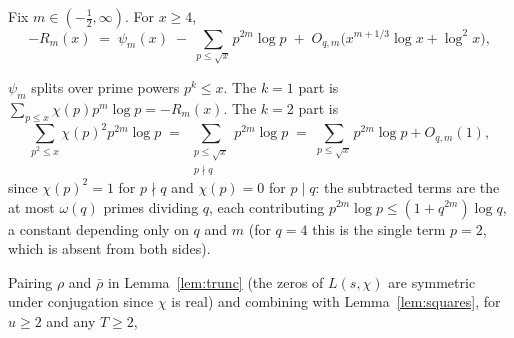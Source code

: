 \begin{lemma}\label{lem:squares}
Fix $m\in(-\tfrac12,\infty)$. For $x\ge4$,
\[
-R_m(x)\;=\;\psi_m(x)\;-\;\sum_{p\le\sqrt x}p^{2m}\log p
\;+\;O_{q,m}\!\bigl(x^{m+1/3}\log x+\log^2x\bigr),
\]

$\psi_m$ splits over prime powers $p^k\le x$. The $k=1$ part is
$\sum_{p\le x}\chi(p)p^m\log p=-R_m(x)$. The $k=2$ part is
\[
\sum_{p^2\le x}\chi(p)^2p^{2m}\log p
\;=\;\sum_{\substack{p\le\sqrt x\\ p\nmid q}}p^{2m}\log p
\;=\;\sum_{p\le\sqrt x}p^{2m}\log p+O_{q,m}(1),
\]
since $\chi(p)^2=1$ for $p\nmid q$ and $\chi(p)=0$ for $p\mid q$: the
subtracted terms are the at most $\omega(q)$ primes dividing $q$, each
contributing $p^{2m}\log p\le(1+q^{2m})\log q$, a constant depending
only on $q$ and $m$ (for $q=4$ this is the single term $p=2$, which is
absent from both sides).

Pairing $\rho$ and $\bar\rho$ in Lemma~\ref{lem:trunc} (the zeros of
$L(s,\chi)$ are symmetric under conjugation since $\chi$ is real)
and combining with Lemma~\ref{lem:squares}, for $u\ge2$ and any
$T\ge2$,


\end{lemma}
